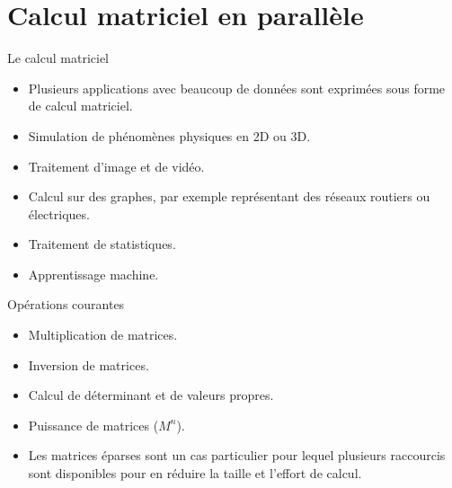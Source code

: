 \documentclass[10pt]{beamer}
\begin{document}
\section{Calcul matriciel en parallèle}

\begin{frame}{Le calcul matriciel}

  \begin{itemize}
    \item Plusieurs applications avec beaucoup de données sont exprimées sous forme de calcul matriciel.

    \item Simulation de phénomènes physiques en 2D ou 3D.

    \item Traitement d'image et de vidéo.

    \item Calcul sur des graphes, par exemple représentant des réseaux routiers ou électriques.

    \item Traitement de statistiques.

    \item Apprentissage machine.
  \end{itemize}
\end{frame}

\begin{frame}{Opérations courantes}

  \begin{itemize}
    \item Multiplication de matrices.

    \item Inversion de matrices.

    \item Calcul de déterminant et de valeurs propres.

    \item Puissance de matrices ($M^n$).

    \item Les matrices éparses sont un cas particulier pour lequel plusieurs raccourcis sont disponibles pour en réduire la taille et l'effort de calcul.
  \end{itemize}
\end{frame}
\end{document}
